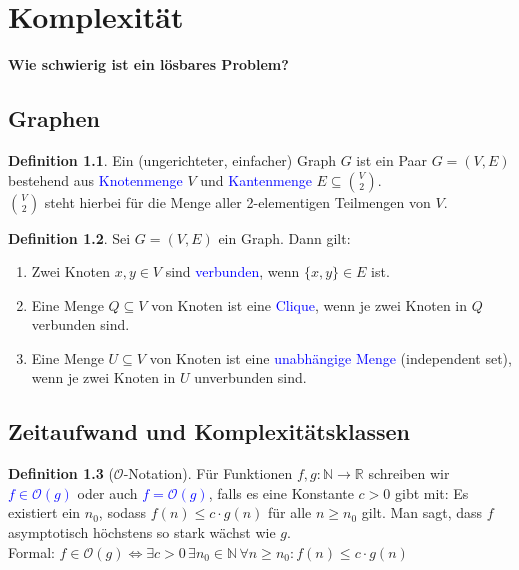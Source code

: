 \documentclass{scrreprt}
\theoremstyle{definition}
\newtheorem{Definition}{Definition}[section]
\theoremstyle{example}
\theoremstyle{algorithm}
\begin{document}
\chapter{Komplexität}
{\Large\textbf{\textsf{Wie schwierig ist ein lösbares Problem?}}}

\section{Graphen}
\begin{Definition}
Ein (ungerichteter, einfacher) Graph $G$ ist ein Paar $G=(V,E)$ bestehend aus \textcolor{blue}{Knotenmenge} $V$ und \textcolor{blue}{Kantenmenge} $E\subseteq \binom{V}{2}$.\\
$\binom{V}{2}$ steht hierbei für die Menge aller 2-elementigen Teilmengen von $V$.
\end{Definition}
\begin{Definition}
Sei $G=(V,E)$ ein Graph. Dann gilt:
\begin{enumerate}
\item Zwei Knoten $x,y \in V$ sind \textcolor{blue}{verbunden}, wenn $\{x,y\} \in E$ ist.
\item Eine Menge $Q \subseteq V$ von Knoten ist eine \textcolor{blue}{Clique}, wenn je zwei Knoten in $Q$ verbunden sind.
\item Eine Menge $U \subseteq V$ von Knoten ist eine \textcolor{blue}{unabhängige Menge} (independent set), wenn je zwei Knoten in $U$ unverbunden sind.
\end{enumerate}
\end{Definition}

\section{Zeitaufwand und Komplexitätsklassen}
\begin{Definition}[$\mathcal{O}$-Notation]
Für Funktionen $f, g: \mathbb{N} \rightarrow \mathbb{R}$ schreiben wir \textcolor{blue}{$f \in \mathcal{O}(g)$} oder auch \textcolor{blue}{$f=\mathcal{O}(g)$}, falls es eine Konstante $c>0$ gibt mit: Es existiert ein $n_0$, sodass $f(n) \leq c \cdot g(n)$ für alle $n\geq n_0$ gilt. Man sagt, dass $f$ asymptotisch höchstens so stark wächst wie $g$.\\
Formal: $f \in \mathcal{O}(g) \Leftrightarrow \exists c>0 \, \exists n_0 \in \mathbb{N}\, \forall n\geq n_0:f(n)\leq c \cdot g(n)$
\end{Definition}
\end{document}
